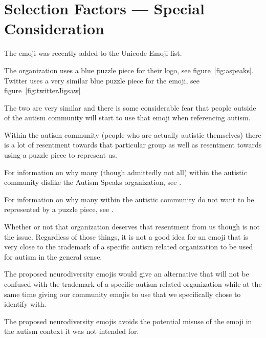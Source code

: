 \section{Selection Factors --- Special Consideration}

The emoji \jigsawemoji{} was recently added to the Unicode Emoji list.

The organization  uses a blue puzzle
piece for their logo, see figure~\ref{fig:aspeaks}. Twitter uses a very similar blue
puzzle piece for the \jigsawemoji{} emoji, see figure~\ref{fig:twitterJigsaw}

The two are very similar and there is some considerable fear that people outside of the
autism community will start to use that emoji when referencing autism.

Within the autism community (people who are actually autistic themselves) there is a lot of
resentment towards that particular group as well as resentment towards using a puzzle piece
to represent us.

For information on why many (though admittedly not all) within the autistic community dislike
the Autism Speaks organization, see
.

For information on why many within the autistic community do not want to be represented by a
puzzle piece, see
.

Whether or not that organization deserves that resentment from us though is not the issue.
Regardless of those things, it is not a good idea for an emoji that is very close to the
trademark of a specific autism related organization to be used for autism in the general
sense.

The proposed neurodiversity emojis would give an alternative that will not be confused
with the trademark of a specific autism related organization while at the same time giving our
community emojis to use that we specifically chose to identify with.

The proposed neurodiversity emojis avoids the potential misuse of the \jigsawemoji{}
emoji in the autism context it was not intended for.

